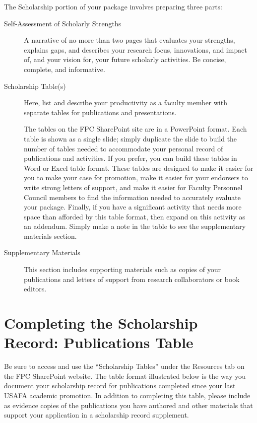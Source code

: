 \documentclass[11pt,titlepage]{article}
\begin{document}
The Scholarship portion of your package involves preparing three parts:
\begin{description}
  \item[Self-Assessment of Scholarly Strengths]
  A narrative of no more than two pages that evaluates your strengths, explains gaps, and describes your research focus, innovations, and impact of, and your vision for, your future scholarly activities.
  Be concise, complete, and informative.

  \item[Scholarship Table(s)]
  Here, list and describe your productivity as a faculty member with separate tables for publications and presentations.

  The tables on the \gls{FPC} SharePoint site are in a PowerPoint format.
  Each table is shown as a single slide; simply duplicate the slide to build the number of tables needed to accommodate your personal record of publications and activities.
  If you prefer, you can build these tables in Word or Excel table format.
  These tables are designed to make it easier for you to make your case for promotion, make it easier for your endorsers to write strong letters of support, and make it easier for Faculty Personnel Council members to find the information needed to accurately evaluate your package.
  Finally, if you have a significant activity that needs more space than afforded by this table format, then expand on this activity as an addendum.
  Simply make a note in the table to see the supplementary materials section.

  \item[Supplementary Materials]
  This section includes supporting materials such as copies of your publications and letters of support from research collaborators or book editors.
\end{description}

\section{Completing the Scholarship Record: Publications Table}  %
Be sure to access and use the ``Scholarship Tables'' under the Resources tab on the \gls{FPC} SharePoint website.
The table format illustrated below is the way you document your scholarship record for publications completed since your last USAFA academic promotion.
In addition to completing this table, please include as evidence copies of the publications you have authored and other materials that support your application in a scholarship record supplement.
\end{document}
